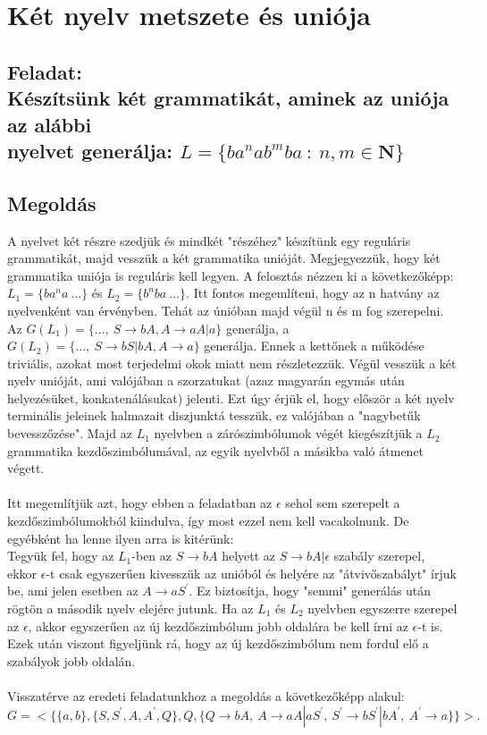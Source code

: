 \documentclass[12pt]{article}
\begin{document}
\section{Két nyelv metszete és uniója}
\subsection{Feladat: \\
Készítsünk két grammatikát, aminek az uniója az alábbi \\ nyelvet generálja:
$ L=\{ ba^{n}ab^{m}ba \ : \ n,m \in \mathbf{N} \} $}
\maketitle
\subsection{Megoldás}
A nyelvet két részre szedjük és mindkét "részéhez" készítünk egy reguláris grammatikát, majd vesszük a két
grammatika unióját. Megjegyezzük, hogy két grammatika uniója is reguláris kell legyen.
A felosztás nézzen ki a következőképp: $ L_{1}=\{ ba^{n}a \ ...\} $ és $ L_{2}=\{ b^{n}ba \ ...\} $.
Itt fontos megemlíteni, hogy az n hatvány az nyelvenként van érvényben. Tehát az únióban majd végül n és m
fog szerepelni.
Az $ G(L_{1})=\{ ..., \ S \rightarrow bA, A \rightarrow aA|a \} $ generálja, a
$ G(L_{2})=\{ ..., \ S \rightarrow bS|bA, A \rightarrow a \} $ generálja. Ennek a kettőnek a működése
triviális, azokat most terjedelmi okok miatt nem részletezzük. Végül vesszük a két nyelv unióját, ami
valójában a szorzatukat (azaz magyarán egymás után helyezésüket, konkatenálásukat) jelenti.
Ezt úgy érjük el, hogy először a két nyelv terminális jeleinek halmazait diszjunktá tesszük, ez valójában
a "nagybetűk bevesszőzése".
Majd az $L_{1}$ nyelvben a zárószimbólumok végét kiegészítjük a $L_{2}$ grammatika
kezdőszimbólumával, az egyik nyelvből a másikba való átmenet végett. \\\\
Itt megemlítjük azt, hogy ebben a feladatban az $\epsilon$ sehol sem szerepelt a kezdőszimbólumokból kiindulva,
így most ezzel nem kell vacakolnunk. De egyébként ha lenne ilyen arra is kitérünk: \\
Tegyük fel, hogy az $ L_{1} $-ben az $S \rightarrow bA$ helyett az $S \rightarrow bA|\epsilon$ 
szabály szerepel, ekkor $\epsilon$-t csak egyszerűen kivesszük az unióból és helyére az "átvivőszabályt" 
írjuk be, ami jelen esetben az $A \rightarrow aS^{'}$. Ez biztosítja, hogy "semmi" generálás után rögtön a
második nyelv elejére jutunk. Ha az $L_{1}$ és $L_{2}$ nyelvben egyszerre szerepel az $\epsilon$,
akkor egyszerűen az új kezdőszimbólum jobb oldalára be kell írni az $\epsilon$-t is.
Ezek után viszont figyeljünk rá, hogy az új kezdőszimbólum nem fordul elő a szabályok jobb oldalán. \\\\
Visszatérve az eredeti feladatunkhoz a megoldás a következőképp alakul: \\
$$ G=<\{ \{a,b\}, \{S,S^{'},A,A^{'},Q \}, Q, \{ Q \rightarrow bA, \ A \rightarrow aA|aS^{'}, \ S^{'} 
\rightarrow bS^{'}|bA^{'}, \ A^{'} \rightarrow a \} \}> . $$
\end{document}
